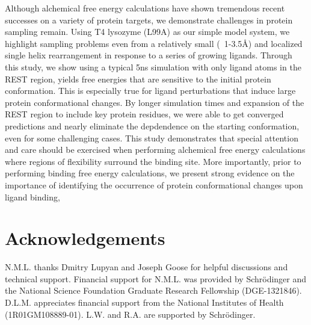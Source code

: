 Although alchemical free energy calculations have shown tremendous recent successes on a variety of protein targets\cite{FEPplus}, we demonstrate challenges in protein sampling remain.
Using T4 lysozyme (L99A) as our simple model system, we highlight sampling problems even from a relatively small (~1-3.5\AA) and localized single helix rearrangement in response to a series of growing ligands.
Through this study, we show using a typical 5ns simulation with only ligand atoms in the REST region, yields free energies that are sensitive to the initial protein conformation.
This is especially true for ligand perturbations that induce large protein conformational changes.
By longer simulation times and expansion of the REST region to include key protein residues, we were able to get converged predictions and nearly eliminate the depdendence on the starting conformation, even for some challenging cases.
This study demonstrates that special attention and care should be exercised when performing alchemical free energy calculations where regions of flexibility surround the binding site.
More importantly, prior to performing binding free energy calculations, we present strong evidence on the importance of identifying the occurrence of protein conformational changes upon ligand binding,

\section{Acknowledgements}
N.M.L. thanks Dmitry Lupyan and Joseph Goose for helpful discussions and technical support. Financial support for N.M.L. was provided by Schr\"{o}dinger and the National Science Foundation Graduate Research Fellowship (DGE-1321846). D.L.M. appreciates financial support from the National Institutes of Health (1R01GM108889-01). L.W. and R.A. are supported by Schr\"{o}dinger.


